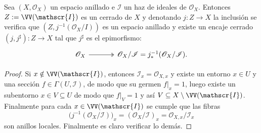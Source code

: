 \addtocounter{thmi}{1}
\begin{slem}
	Sea $(X, \mathscr{O}_X )$ un espacio anillado e $\mathscr{I}$ un haz de ideales de $\mathscr{O}_X$.
	Entonces $Z := \VV(\mathscr{I})$ es un cerrado de $X$ y denotando $j \colon Z \to X$ la
	inclusión se verifica que $(Z, j^{-1} (\mathscr{O}_X /I ))$ es un espacio anillado y existe un
	encaje cerrado $(j, j^\sharp ) \colon Z \to X$ tal que $j^\sharp$ es el epimorfismo:
	\begin{equation}
		\begin{tikzcd}[sep=large]
			\mathscr{O}_X \rar[two heads] & \mathscr{O}_X/\mathscr{I} = j_*^{-1}(\mathscr{O}_X/\mathscr{I}).
		\end{tikzcd}
		\label{eqn:closed_inmersion}
	\end{equation}
\end{slem}
\begin{proof}
	Si $x \notin \VV(\mathscr{I})$, entonces $\mathscr{I}_x = \mathscr{O}_{X,x}$ y existe un entorno
	$x \in U$ y una sección $f \in \Gamma(U, \mathscr{I})$, de modo que su germen $f|_x = 1$, luego
	existe un subentorno $x \in V \subseteq U$ de modo que $f|_V = 1$ y así $V \subseteq X \setminus \VV(\mathscr{I})$.
	Finalmente para cada $x \in \VV(\mathscr{I})$ se cumple que las fibras
	$$ \big( j^{-1} (\mathscr{O}_X /\mathscr{I} ) \big)_x = (\mathscr{O}_X /\mathscr{I} )_x = \mathscr{O}_{X,x}/\mathscr{I}_x $$
	son anillos locales. Finalmente es claro verificar lo demás.
\end{proof}
\addtocounter{thmi}{-1}

